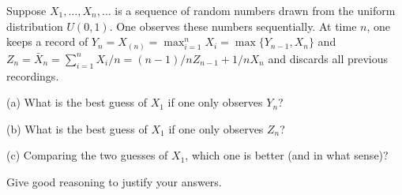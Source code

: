 \begin{exercise}\label{probability:2014:4}
Suppose $X_1, \dots, X_n, \dots$ is a sequence of random numbers drawn from the uniform distribution $U(0,1)$. One observes these numbers sequentially. At time $n$, one keeps a record of $Y_n = X_{(n)} = \max_{i=1}^n X_i = \max\{Y_{n-1}, X_n\}$ and $Z_n = \bar{X}_n = \sum_{i=1}^n X_i / n = (n-1)/n Z_{n-1} + 1/n X_n$ and discards all previous recordings.

(a) What is the best guess of $X_1$ if one only observes $Y_n$?

(b) What is the best guess of $X_1$ if one only observes $Z_n$?

(c) Comparing the two guesses of $X_1$, which one is better (and in what sense)?

Give good reasoning to justify your answers.
\end{exercise}

